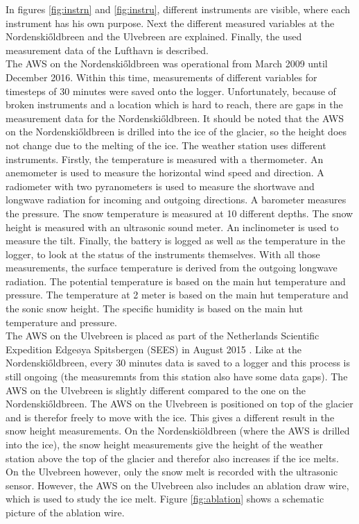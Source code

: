 \documentclass[11pt]{report}
\begin{document}
In figures \ref{fig:instrn} and \ref{fig:instru}, different instruments are visible, where each instrument has his own purpose. Next the different measured variables at the Nordenski\H{o}ldbreen and the Ulvebreen are explained. Finally, the used measurement data of the Lufthavn is described.\\

The AWS on the Nordenski\H{o}ldbreen was operational from March 2009 until December 2016. Within this time, measurements of different variables for timesteps of 30 minutes were saved onto the logger. Unfortunately, because of broken instruments and a location which is hard to reach, there are gaps in the measurement data for the Nordenski\H{o}ldbreen. It should be noted that the AWS on the Nordenski\H{o}ldbreen is drilled into the ice of the glacier, so the height does not change due to the melting of the ice. The weather station uses different instruments. Firstly, the temperature is measured with a thermometer. An anemometer is used to measure the horizontal wind speed and direction. A radiometer with two pyranometers is used to measure the shortwave and longwave radiation for incoming and outgoing directions. A barometer measures the pressure. The snow temperature is measured at 10 different depths. The snow height is measured with an ultrasonic sound meter. An inclinometer is used to measure the tilt.  Finally, the battery is logged as well as the temperature in the logger, to look at the status of the instruments themselves. With all those measurements, the surface temperature is derived from the outgoing longwave radiation. The potential temperature is based on the main hut temperature and pressure. The temperature at 2 meter is based on the main hut temperature and the sonic snow height. The specific humidity is based on the main hut temperature and pressure. \\

The AWS on the Ulvebreen is placed as part of the Netherlands Scientific Expedition Edge$ø$ya Spitsbergen (SEES) in August 2015 \cite{uuproj}. Like at the Nordenski\H{o}ldbreen, every 30 minutes data is saved to a logger and this process is still ongoing (the measuremnts from this station also have some data gaps). The AWS on the Ulvebreen is slightly different compared to the one on the Nordenski\H{o}ldbreen. The AWS on the Ulvebreen is positioned on top of the glacier and is therefor freely to move with the ice. This gives a different result in the snow height measurements. On the Nordenskiöldbreen (where the AWS is drilled into the ice), the snow height measurements give the height of the weather station above the top of the glacier and therefor also increases if the ice melts. On the Ulvebreen however, only the snow melt is recorded with the ultrasonic sensor. However, the AWS on the Ulvebreen also includes an ablation draw wire, which is used to study the ice melt. Figure \ref{fig:ablation} shows a schematic picture of the ablation wire. 
\end{document}
